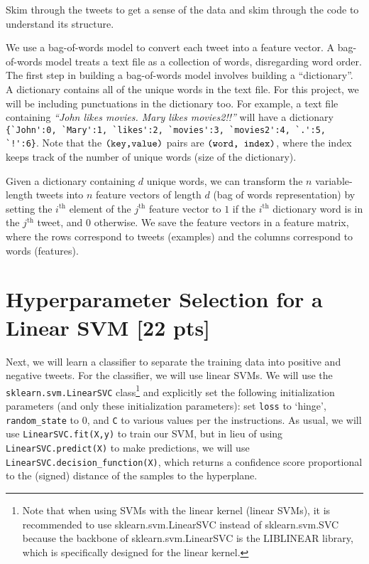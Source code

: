 \documentclass[11pt]{article}
\begin{document}
Skim through the tweets to get a sense of the data and skim through the code to understand its structure.

We use a bag-of-words model to convert each tweet into a feature vector. A bag-of-words model treats a text file as a collection of words, disregarding word order. The first step in building a bag-of-words model involves building a ``dictionary''. A dictionary contains all of the unique words in the text file. For this project, we will be including punctuations in the dictionary too. For example, a text file containing \textit{``John likes movies. Mary likes movies2!!''} will have a dictionary \verb|{`John':0, `Mary':1, `likes':2, `movies':3, `movies2':4, `.':5, `!':6}|. Note that the $\verb|(key,value)|$ pairs are $\verb|(word, index)|$, where the index keeps track of the number of unique words (size of the dictionary).

Given a dictionary containing $d$ unique words, we can transform the $n$ variable-length tweets into $n$ feature vectors of length $d$ (bag of words representation) by setting the $i^\textrm{th}$ element of the $j^\textrm{th}$ feature vector to $1$ if the $i^\textrm{th}$ dictionary word is in the $j^\textrm{th}$ tweet, and $0$ otherwise. We save the feature vectors in a feature matrix, where the rows correspond to tweets (examples) and the columns correspond to words (features).

\section{Hyperparameter Selection for a Linear SVM [22 pts]}\label{sec:linear}

Next, we will learn a classifier to separate the training data into positive and negative tweets. For the classifier, we will use linear SVMs. We will use the \verb|sklearn.svm.LinearSVC| class\footnote{Note that when using SVMs with the linear kernel (linear SVMs), it is recommended to use sklearn.svm.LinearSVC instead of sklearn.svm.SVC because the backbone of sklearn.svm.LinearSVC is the LIBLINEAR library, which is specifically designed for the linear kernel.} and explicitly set the following initialization parameters (and only these initialization parameters): set \verb|loss| to `hinge', \verb|random_state| to 0, and \verb|C| to various values per the instructions. As usual, we will use \verb|LinearSVC.fit(X,y)| to train our SVM, but in lieu of using \verb|LinearSVC.predict(X)| to make predictions, we will use \verb|LinearSVC.decision_function(X)|, which returns a confidence score proportional to the (signed) distance of the samples to the hyperplane.
\end{document}
